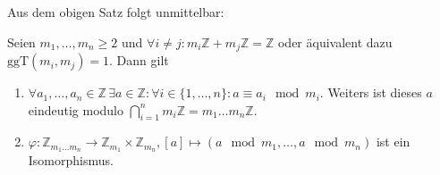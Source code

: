 Aus dem obigen Satz folgt unmittelbar:

\begin{corollary}
    Seien $m_1,\ldots,m_n\geq 2$ und $\forall i\neq j: m_i\mathbb{Z}+m_j\mathbb{Z}=\mathbb{Z}$
    oder äquivalent dazu $\text{ggT}(m_i,m_j)=1$. Dann gilt
    \begin{enumerate}
        \item $\forall a_1,\ldots,a_n\in\mathbb{Z}\,\exists a\in\mathbb{Z}:\forall i\in\{1,\ldots,n\}: a\equiv a_i \mod m_i$.
        Weiters ist dieses $a$ eindeutig modulo $\bigcap_{i=1}^{n}m_i\mathbb{Z}=m_1\ldots m_n\mathbb{Z}$.
        \item $\varphi:\mathbb{Z}_{m_1\ldots m_n}\to \mathbb{Z}_{m_1}\times \mathbb{Z}_{m_n}, [a]\mapsto (a\mod m_1,\ldots, a\mod m_n)$
        ist ein Isomorphismus.
    \end{enumerate}
\end{corollary}


